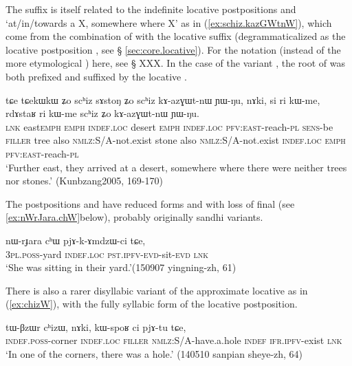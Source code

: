 The suffix  is itself related to the indefinite locative postpositions  and  `at/in/towards a X, somewhere where X' as in (\ref{ex:schiz.kazGWtnW}), which come from the combination of  with the locative suffix  (degrammaticalized as the locative postposition , see § \ref{sec:core.locative}). For the notation  (instead of the more etymological ) here, see § XXX. In the case of the variant , the root of  was both prefixed and suffixed by the locative .

\begin{exe}
\ex \label{ex:schiz.kazGWtnW}
 \gll  tɕe tɕekɯ\redp{}kɯ ʑo scʰiz sɤstoŋ ʑo scʰiz kɤ-azɣɯt-nɯ ɲɯ-ŋu, nɤki, si ri kɯ-me, rdɤstaʁ ri kɯ-me scʰiz ʑo kɤ-azɣɯt-nɯ ɲɯ-ŋu. \\
 \textsc{lnk} east\redp{}\textsc{emph} \textsc{emph} \textsc{indef}.\textsc{loc} desert \textsc{emph} \textsc{indef}.\textsc{loc} \textsc{pfv}:\textsc{east}-reach-\textsc{pl} \textsc{sens}-be \textsc{filler} tree also \textsc{nmlz}:S/A-not.exist stone also \textsc{nmlz}:S/A-not.exist \textsc{indef}.\textsc{loc}  \textsc{emph}  \textsc{pfv}:\textsc{east}-reach-\textsc{pl} \\
 \glt `Further east, they arrived at  a desert, somewhere where there were neither trees nor stones.' (Kunbzang2005, 169-170)
\end{exe}

The postpositions  and  have reduced forms  and  with loss of final  (see \ref{ex:nWrJara.chW}below), probably originally sandhi variants.

\begin{exe}
\ex \label{ex:nWrJara.chW}
\gll nɯ-rɟara cʰɯ pjɤ-k-ɤmdzɯ-ci tɕe, \\
\textsc{3pl}.\textsc{poss}-yard \textsc{indef}.\textsc{loc} \textsc{pst}.\textsc{ipfv}-\textsc{evd}-sit-\textsc{evd} \textsc{lnk} \\
\glt `She was sitting in their yard.'(150907 yingning-zh, 61)
\end{exe}

There is also a rarer disyllabic variant of the approximate locative  as in (\ref{ex:chizW}), with the fully syllabic form  of the locative postposition.

\begin{exe}
\ex \label{ex:chizW}
\gll tɯ-βzɯr cʰizɯ, nɤki, kɯ-spoʁ ci pjɤ-tu tɕe,  \\
\textsc{indef}.\textsc{poss}-corner \textsc{indef}.\textsc{loc} \textsc{filler} \textsc{nmlz}:S/A-have.a.hole \textsc{indef} \textsc{ifr}.\textsc{ipfv}-exist \textsc{lnk} \\
\glt `In one of the corners, there was a hole.' (140510 sanpian sheye-zh, 64)
\end{exe}

